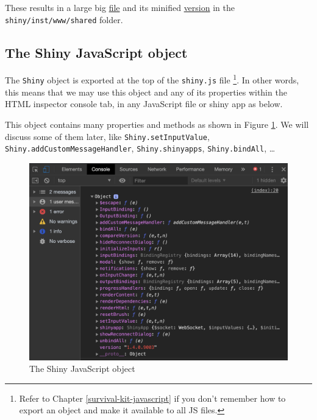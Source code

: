 \documentclass[]{book}
\newenvironment{Shaded}{\begin{snugshade}}{\end{snugshade}}
\newcommand{\ControlFlowTok}[1]{\textcolor[rgb]{0.13,0.29,0.53}{\textbf{#1}}}
\newcommand{\KeywordTok}[1]{\textcolor[rgb]{0.13,0.29,0.53}{\textbf{#1}}}
\newcommand{\NormalTok}[1]{#1}
\newcommand{\OperatorTok}[1]{\textcolor[rgb]{0.81,0.36,0.00}{\textbf{#1}}}
\newcommand{\StringTok}[1]{\textcolor[rgb]{0.31,0.60,0.02}{#1}}
\begin{document}
These results in a large big \href{https://github.com/rstudio/shiny/blob/master/inst/www/shared/shiny.js}{file} and its minified \href{https://github.com/rstudio/shiny/blob/master/inst/www/shared/shiny.min.js}{version} in the \texttt{shiny/inst/www/shared} folder.

\hypertarget{the-shiny-javascript-object}{%
\subsection{The Shiny JavaScript object}\label{the-shiny-javascript-object}}

The \texttt{Shiny} object is exported at the top of the \texttt{shiny.js} file \footnote{Refer to Chapter \ref{survival-kit-javascript} if you don't remember how to export an object and make it available to all JS files.}. In other words, this means that we may use this object and any of its properties within the HTML inspector console tab, in any JavaScript file or shiny app as below.

\begin{Shaded}
\end{Shaded}

This object contains many properties and methods as shown in Figure \ref{fig:shiny-object}. We will discuss some of them later, like \texttt{Shiny.setInputValue}, \texttt{Shiny.addCustomMessageHandler}, \texttt{Shiny.shinyapps}, \texttt{Shiny.bindAll}, \ldots{}

\begin{figure}
\includegraphics[width=17.44in]{images/survival-kit/shiny-object} \caption{The Shiny JavaScript object}\label{fig:shiny-object}
\end{figure}
\end{document}
